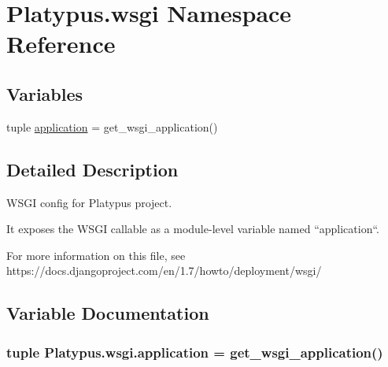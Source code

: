 \hypertarget{namespace_platypus_1_1wsgi}{}\section{Platypus.\+wsgi Namespace Reference}
\label{namespace_platypus_1_1wsgi}
\subsection*{Variables}
\begin{DoxyCompactItemize}
\item 
tuple \hyperlink{namespace_platypus_1_1wsgi_a942289c73a116be14daec2618a9c7a12}{application} = get\+\_\+wsgi\+\_\+application()
\end{DoxyCompactItemize}


\subsection{Detailed Description}
\begin{DoxyVerb}WSGI config for Platypus project.

It exposes the WSGI callable as a module-level variable named ``application``.

For more information on this file, see
https://docs.djangoproject.com/en/1.7/howto/deployment/wsgi/
\end{DoxyVerb}
 

\subsection{Variable Documentation}
\hypertarget{namespace_platypus_1_1wsgi_a942289c73a116be14daec2618a9c7a12}{}
\subsubsection[{application}]{\setlength{\rightskip}{0pt plus 5cm}tuple Platypus.\+wsgi.\+application = get\+\_\+wsgi\+\_\+application()}\label{namespace_platypus_1_1wsgi_a942289c73a116be14daec2618a9c7a12}
